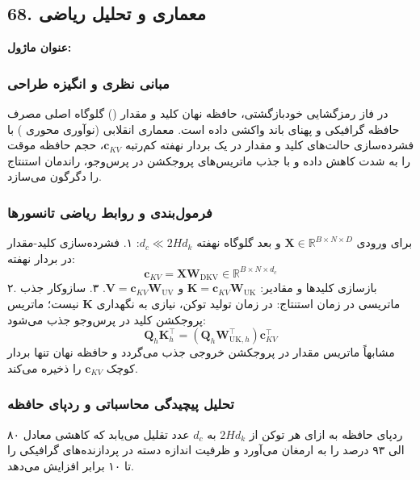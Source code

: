 \subsection*{68. معماری و تحلیل ریاضی }
\textbf{عنوان ماژول:} 

\subsubsection*{مبانی نظری و انگیزه طراحی}
در فاز رمزگشایی خودبازگشتی، حافظه نهان کلید و مقدار () گلوگاه اصلی مصرف حافظه گرافیکی و پهنای باند واکشی داده است. معماری انقلابی  (نوآوری محوری ) با فشرده‌سازی حالت‌های کلید و مقدار در یک بردار نهفته کم‌رتبه $\mathbf{c}_{KV}$، حجم حافظه موقت را به شدت کاهش داده و با جذب ماتریس‌های پروجکشن در پرس‌وجو، راندمان استنتاج را دگرگون می‌سازد.

\subsubsection*{فرمول‌بندی و روابط ریاضی تانسورها}
برای ورودی $\mathbf{X} \in \mathbb{R}^{B \times N \times D}$ و بعد گلوگاه نهفته $d_c \ll 2 H d_k$:
۱. فشرده‌سازی کلید-مقدار در بردار نهفته:
\begin{equation}
\mathbf{c}_{KV} = \mathbf{X} \mathbf{W}_{\text{DKV}} \in \mathbb{R}^{B \times N \times d_c}
\end{equation}
۲. بازسازی کلیدها و مقادیر: $\mathbf{K} = \mathbf{c}_{KV} \mathbf{W}_{\text{UK}}$ و $\mathbf{V} = \mathbf{c}_{KV} \mathbf{W}_{\text{UV}}$.
۳. سازوکار جذب ماتریسی در زمان استنتاج: در زمان تولید توکن، نیازی به نگهداری $\mathbf{K}$ نیست؛ ماتریس پروجکشن کلید در پرس‌وجو جذب می‌شود:
\begin{equation}
\mathbf{Q}_h \mathbf{K}_h^\top = (\mathbf{Q}_h \mathbf{W}_{\text{UK}, h}^\top) \mathbf{c}_{KV}^\top
\end{equation}
مشابهاً ماتریس مقدار در پروجکشن خروجی جذب می‌گردد و حافظه نهان تنها بردار کوچک $\mathbf{c}_{KV}$ را ذخیره می‌کند.

\subsubsection*{تحلیل پیچیدگی محاسباتی و ردپای حافظه}
ردپای حافظه  به ازای هر توکن از $2 H d_k$ به $d_c$ عدد تقلیل می‌یابد که کاهشی معادل ۸۰ الی ۹۳ درصد را به ارمغان می‌آورد و ظرفیت اندازه دسته در پردازنده‌های گرافیکی را تا ۱۰ برابر افزایش می‌دهد.


